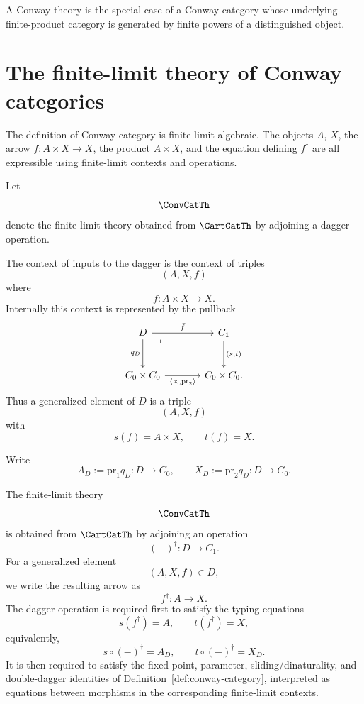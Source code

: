 A Conway theory is the special case of a Conway category whose underlying
finite-product category is generated by finite powers of a distinguished
object.

\section{The finite-limit theory of Conway categories}
\label{sec:finite-limit-theory-conway-categories}

The definition of Conway category is finite-limit algebraic.  The objects
\(A\), \(X\), the arrow \(f:A\times X\to X\), the product \(A\times X\), and
the equation defining \(f^\dagger\) are all expressible using finite-limit
contexts and operations.

Let
\[
\ConvCatTh
\]
denote the finite-limit theory obtained from \(\CartCatTh\) by adjoining a
dagger operation.

The context of inputs to the dagger is the context of triples
\[
(A,X,f)
\]
where
\[
f:A\times X\to X.
\]
Internally this context is represented by the pullback
\[
\begin{tikzcd}[column sep=large,row sep=large]
D
  \arrow[r,"\bar f"]
  \arrow[d,"q_D"']
  \arrow[dr,phantom,"\lrcorner",very near start]
&
C_1
  \arrow[d,"{(s,t)}"]
\\
C_0\times C_0
  \arrow[r,"{\langle \times,\mathrm{pr}_2\rangle}"']
&
C_0\times C_0 .
\end{tikzcd}
\]
Thus a generalized element of \(D\) is a triple
\[
(A,X,f)
\]
with
\[
s(f)=A\times X,
\qquad
t(f)=X.
\]

Write
\[
A_D:=\mathrm{pr}_1q_D:D\to C_0,
\qquad
X_D:=\mathrm{pr}_2q_D:D\to C_0.
\]

\begin{definition}
\label{def:convcatth}
The finite-limit theory
\[
\ConvCatTh
\]
is obtained from \(\CartCatTh\) by adjoining an operation
\[
(-)^\dagger:D\to C_1.
\]
For a generalized element
\[
(A,X,f)\in D,
\]
we write the resulting arrow as
\[
f^\dagger:A\to X.
\]
The dagger operation is required first to satisfy the typing equations
\[
s(f^\dagger)=A,
\qquad
t(f^\dagger)=X,
\]
equivalently,
\[
s\circ(-)^\dagger=A_D,
\qquad
t\circ(-)^\dagger=X_D.
\]
It is then required to satisfy the fixed-point, parameter,
sliding/dinaturality, and double-dagger identities of
Definition~\ref{def:conway-category}, interpreted as equations between
morphisms in the corresponding finite-limit contexts.
\end{definition}

